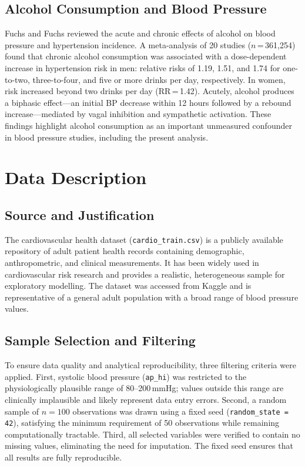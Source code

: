 ﻿\documentclass[conference]{IEEEtran}
\begin{document}
\subsection{Alcohol Consumption and Blood Pressure}

Fuchs and Fuchs \cite{alcohol2021} reviewed the acute and chronic effects of
alcohol on blood pressure and hypertension incidence. A meta-analysis of 20
studies ($n$\,=\,361{,}254) found that chronic alcohol consumption was associated
with a dose-dependent increase in hypertension risk in men: relative risks of
1.19, 1.51, and 1.74 for one-to-two, three-to-four, and five or more drinks per
day, respectively. In women, risk increased beyond two drinks per day (RR\,=\,1.42).
Acutely, alcohol produces a biphasic effect---an initial BP decrease within 12
hours followed by a rebound increase---mediated by vagal inhibition and
sympathetic activation. These findings highlight alcohol consumption as an
important unmeasured confounder in blood pressure studies, including the present
analysis.

\section{Data Description}
\label{sec:data}

\subsection{Source and Justification}

The cardiovascular health dataset (\texttt{cardio\_train.csv}) is a publicly available repository of adult patient health records containing demographic, anthropometric, and clinical measurements. It has been widely used in cardiovascular risk research and provides a realistic, heterogeneous sample for exploratory modelling. The dataset was accessed from Kaggle and is representative of a general adult population with a broad range of blood pressure values.

\subsection{Sample Selection and Filtering}

To ensure data quality and analytical reproducibility, three filtering criteria were applied. First, systolic blood pressure (\texttt{ap\_hi}) was restricted to the physiologically plausible range of 80--200\,mmHg; values outside this range are clinically implausible and likely represent data entry errors. Second, a random sample of $n = 100$ observations was drawn using a fixed seed (\texttt{random\_state\,=\,42}), satisfying the minimum requirement of 50 observations while remaining computationally tractable. Third, all selected variables were verified to contain no missing values, eliminating the need for imputation. The fixed seed ensures that all results are fully reproducible.
\end{document}
